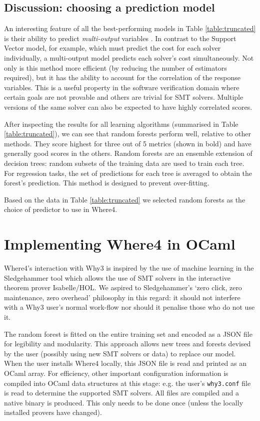 \documentclass[runningheads,a4paper]{llncs}
\begin{document}
\subsection{Discussion: choosing a prediction model}
An interesting feature of all the best-performing models in Table \ref{table:truncated} is their ability to predict \textit{multi-output} variables \cite{multisurvey}. In contrast to the Support Vector model, for example, which must predict the cost for each solver individually, a multi-output model predicts each solver's cost simultaneously. Not only is this method more efficient (by reducing the number of estimators required), but it has the ability to account for the correlation of the response variables. This is a useful property in the software verification domain where certain goals are not provable and others are trivial for SMT solvers. Multiple versions of the same solver can also be expected to have highly correlated scores.

After inspecting the results for all learning algorithms (summarised in Table \ref{table:truncated}), we can see that random forests \cite{RandomForests} perform well, relative to other methods. They score highest for three out of 5 metrics (shown in bold) and have generally good scores in the others. Random forests are an ensemble extension of decision trees: random subsets of the training data are used to train each tree. For regression tasks, the set of predictions for each tree is averaged to obtain the forest's prediction. This method is designed to prevent over-fitting. 

Based on the data in Table \ref{table:truncated} we selected random forests as the choice of predictor to use in \textsf{Where4}.   



\section{Implementing \textsf{Where4} in OCaml}

\textsf{Where4}'s interaction with \textsf{Why3} is inspired by the use of machine learning in the Sledgehammer tool \cite{Sledgehammer} which allows the use of SMT solvers in the interactive theorem prover Isabelle/HOL. We aspired to Sledgehammer's `zero click, zero maintenance, zero overhead' philosophy in this regard: it should not interfere with a \textsf{Why3} user's normal work-flow nor should it penalise those who do not use it.

The random forest is fitted on the entire training set and encoded as a JSON file for legibility and modularity. This approach allows new trees and forests devised by the user (possibly using new SMT solvers or data) to replace our model.  When the user installs \textsf{Where4} locally, this JSON file is read and printed as an OCaml array. For efficiency, other important configuration information is compiled into OCaml data structures at this stage: e.g. the user's \texttt{why3.conf} file is read to determine the supported SMT solvers. All files are compiled and a native binary is produced. This only needs to be done once (unless the locally installed provers have changed). 
\end{document}
